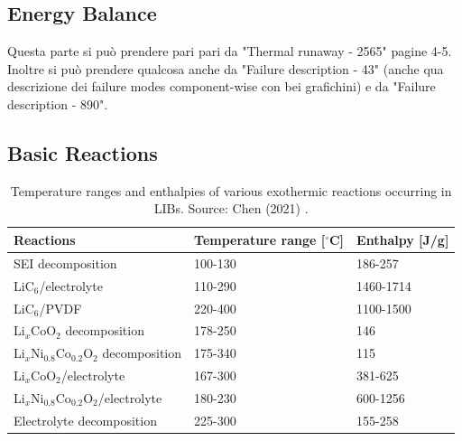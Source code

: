 \subsection{Energy Balance}
\label{sec:energy-balance}
Questa parte si può prendere pari pari da "Thermal runaway - 2565" pagine 4-5. Inoltre si può prendere qualcosa anche da "Failure description - 43" (anche qua descrizione dei failure modes component-wise con bei grafichini) e da "Failure description - 890".

\subsection{Basic Reactions}
\label{sec:basic-reactions}
\begin{table}[ht]
    \centering
    \begin{footnotesize}
        \begin{tabular}{|P{55mm} P{28mm} P{20mm}|}
            \hline
            \vspace{0.1mm}\textbf{Reactions} & \textbf{Temperature range [$^\circ$C]} & \textbf{Enthalpy [J/g]}\T\B \\
            \hline \hline

            SEI decomposition & 100-130 & 186-257\T\B\\

            LiC$_6$/electrolyte & 110-290 & 1460-1714\T\B\\

            LiC$_6$/PVDF & 220-400 & 1100-1500\T\B\\

            Li$_x$CoO$_2$ decomposition & 178-250 & 146\T\B\\

            Li$_x$Ni$_{0.8}$Co$_{0.2}$O$_2$ decomposition & 175-340 & 115\T\B\\

            Li$_x$CoO$_2$/electrolyte & 167-300 & 381-625\T\B\\

            Li$_x$Ni$_{0.8}$Co$_{0.2}$O$_2$/electrolyte & 180-230 & 600-1256\T\B\\

            Electrolyte decomposition & 225-300 & 155-258\T\B\\
            \hline
        \end{tabular}
        \\[10pt]
        \caption[Exothermic reactions occurring in LIBs]{Temperature ranges and enthalpies of various exothermic reactions occurring in LIBs. Source: Chen (2021) \cite{chen2021review}.}
        \label{table:reactions}
    \end{footnotesize}
\end{table}



